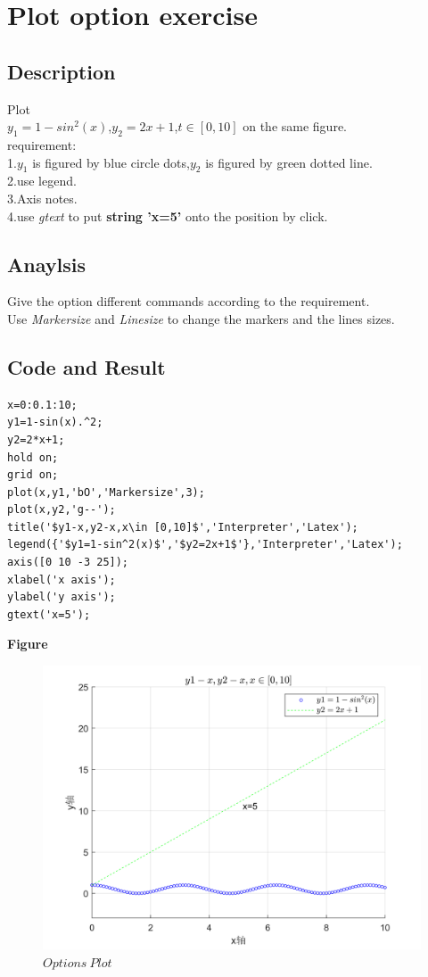 \documentclass[UTF8,a4paper]{article}
\begin{document}
\section{Plot option exercise}
\subsection{Description}
\noindent Plot \\
$y_1=1-sin^2(x)$,$y_2=2x+1$,$t \in [0,10]$ on the same figure.\\
requirement:\\
1.$y_1$ is figured by blue circle dots,$y_2$ is figured by green dotted line.\\
2.use legend.\\
3.Axis notes.\\
4.use \textit{gtext} to put \textbf{string 'x=5'} onto the position by click.
\subsection{Anaylsis}
\noindent Give the option different commands according to the requirement.\\
Use \textit{Markersize} and \textit{Linesize} to change the markers and the lines sizes.
\subsection{Code and Result}
\begin{lstlisting}
x=0:0.1:10;
y1=1-sin(x).^2;
y2=2*x+1;
hold on;
grid on;
plot(x,y1,'bO','Markersize',3);
plot(x,y2,'g--');
title('$y1-x,y2-x,x\in [0,10]$','Interpreter','Latex');
legend({'$y1=1-sin^2(x)$','$y2=2x+1$'},'Interpreter','Latex');
axis([0 10 -3 25]);
xlabel('x axis');
ylabel('y axis');
gtext('x=5');
\end{lstlisting}
\textbf{Figure}
\begin{figure}[h]
    \centering
    \includegraphics[width=1\textwidth]{T4-4.png}
    \caption{$Options~Plot$}
    \label{4}
\end{figure}
\end{document}
